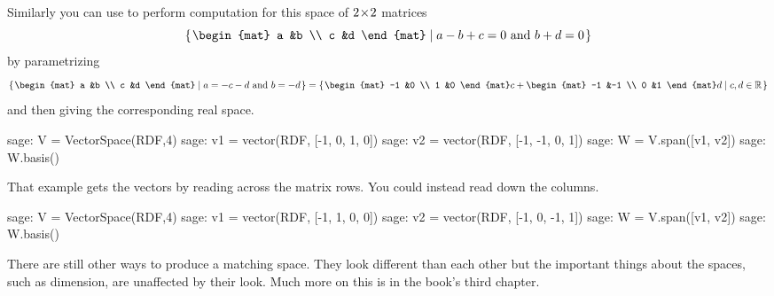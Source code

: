 Similarly you can use \Sage{} to 
perform computation for this space of $2 \! \times \! 2$ matrices
\begin{equation*}
  \set{\begin{mat}
         a  &b \\
         c  &d
       \end{mat}\suchthat \text{$a-b+c=0$ and $b+d=0$}}
\end{equation*}
by parametrizing
\begin{equation*}
  \set{\begin{mat}
         a  &b \\
         c  &d
       \end{mat}\suchthat \text{$a=-c-d$ and $b=-d$}}
  =\set{\begin{mat}
         -1  &0 \\
          1  &0
       \end{mat}c
       +
       \begin{mat}
         -1  &-1 \\
          0  &1
       \end{mat}d
       \suchthat c,d\in\Re}
\end{equation*}
and then giving \Sage{} the corresponding real space.
\begin{sagecommandline}
sage: V = VectorSpace(RDF,4)
sage: v1 = vector(RDF, [-1, 0, 1, 0])
sage: v2 = vector(RDF, [-1, -1, 0, 1])
sage: W = V.span([v1, v2])
sage: W.basis()
\end{sagecommandline}
That example gets the vectors by reading across the matrix rows.
You could instead read
down the columns.  
\begin{sagecommandline}
sage: V = VectorSpace(RDF,4)
sage: v1 = vector(RDF, [-1, 1, 0, 0])
sage: v2 = vector(RDF, [-1, 0, -1, 1])
sage: W = V.span([v1, v2])
sage: W.basis()
\end{sagecommandline}
There are still other ways to produce a matching space.
They look different than each other
but the important things about the spaces, such as dimension, are 
unaffected by their look.
Much more on this is in the book's third chapter.

\endinput


TODO:

